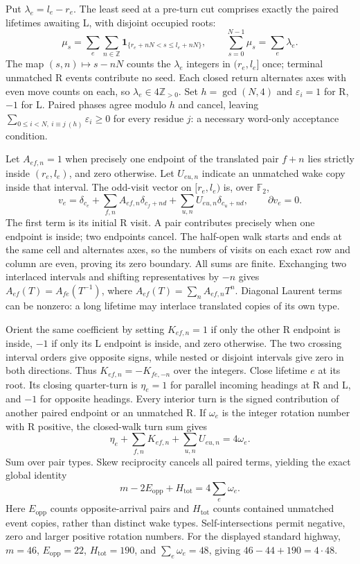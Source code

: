 \documentclass[11pt,letterpaper]{article}
\newcommand{\F}{\mathbb F}
\newcommand{\Z}{\mathbb Z}
\begin{document}
Put $\lambda_e=l_e-r_e$. The least seed at a pre-turn cut comprises
exactly the paired lifetimes awaiting L, with disjoint occupied roots:
\[
\mu_s=\sum_e\sum_{n\in\Z}\mathbf1_{\{r_e+nN<s\le l_e+nN\}},
\qquad \sum_{s=0}^{N-1}\mu_s=\sum_e\lambda_e.
\]
The map $(s,n)\mapsto s-nN$ counts the $\lambda_e$ integers in
$(r_e,l_e]$ once; terminal unmatched R events contribute no seed.
Each closed return alternates axes with even move counts on each, so
$\lambda_e\in4\Z_{>0}$. Set $h=\gcd(N,4)$ and
$\varepsilon_i=1$ for R, $-1$ for L. Paired phases agree modulo $h$
and cancel, leaving $\sum_{0\le i<N,\ i\equiv j\ (h)}\varepsilon_i\ge0$ for
every residue $j$: a necessary word-only acceptance condition.

Let $A_{ef,n}=1$ when precisely one endpoint of the translated pair
$f+n$ lies strictly inside $(r_e,l_e)$, and zero otherwise.
Let $U_{eu,n}$ indicate an unmatched wake copy inside that interval.
The odd-visit vector on $[r_e,l_e)$ is, over $\F_2$,
\[
v_e=\delta_{c_e}+\sum_{f,n}A_{ef,n}\delta_{c_f+nd}
                 +\sum_{u,n}U_{eu,n}\delta_{c_u+nd},
\qquad\partial v_e=0.
\]
The first term is its initial R visit. A pair contributes precisely
when one endpoint is inside; two endpoints cancel. The half-open walk
starts and ends at the same cell and alternates axes, so the numbers of
visits on each exact row and column are even, proving its zero boundary.
All sums are finite. Exchanging two interlaced intervals and shifting
representatives by $-n$ gives
$A_{ef}(T)=A_{fe}(T^{-1})$, where
$A_{ef}(T)=\sum_nA_{ef,n}T^n$. Diagonal Laurent terms can be nonzero:
a long lifetime may interlace translated copies of its own type.

Orient the same coefficient by setting $K_{ef,n}=1$ if only the
other R endpoint is inside, $-1$ if only its L endpoint is inside,
and zero otherwise. The two crossing interval orders give opposite
signs, while nested or disjoint intervals give zero in both directions.
Thus $K_{ef,n}=-K_{fe,-n}$ over the integers.
Close lifetime $e$ at its root. Its closing quarter-turn is
$\eta_e=1$ for parallel incoming headings at R and L, and $-1$
for opposite headings. Every interior turn is the signed contribution
of another paired endpoint or an unmatched R. If $\omega_e$ is the
integer rotation number with R positive, the closed-walk turn sum gives
\[
\eta_e+\sum_{f,n}K_{ef,n}+\sum_{u,n}U_{eu,n}=4\omega_e.
\]
Sum over pair types. Skew reciprocity cancels all paired terms, yielding
the exact global identity
\[
\boxed{m-2E_{\mathrm{opp}}+H_{\mathrm{tot}}=4\sum_e\omega_e.}
\]
Here $E_{\mathrm{opp}}$ counts opposite-arrival pairs and
$H_{\mathrm{tot}}$ counts contained unmatched event copies, rather than
distinct wake types. Self-intersections permit negative, zero and larger
positive rotation numbers. For the displayed standard highway,
$m=46$, $E_{\mathrm{opp}}=22$, $H_{\mathrm{tot}}=190$, and
$\sum_e\omega_e=48$, giving $46-44+190=4\cdot48$.
\end{document}
